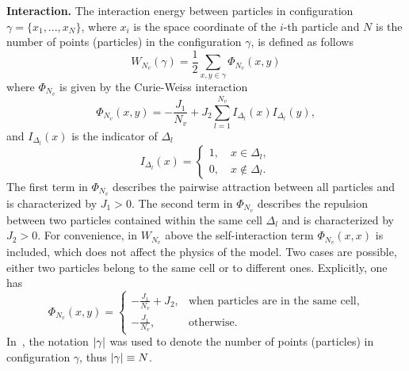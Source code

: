 \documentclass[12pt]{article}
\numberwithin{equation}{section}
\begin{document}
	\textbf{Interaction.} The interaction energy between particles in configuration $\gamma = \{x_1, ..., x_N\}$, where $x_i$ is the space coordinate of the $i$-th particle and $N$ is the number of points (particles) in the configuration $\gamma$, is defined as follows
	\begin{equation*}
		W_{N_v}(\gamma) = \frac{1}{2} \sum_{x,y \in \gamma} \Phi_{N_v} (x,y)
	\end{equation*}
	where $\Phi_{N_v}$ is given by the Curie-Weiss interaction
	\begin{equation}
		\label{def:curie-weiss-pot}
		\Phi_{N_v}(x, y) = -\frac{J_1}{N_v} + J_2\sum_{l=1}^{N_v} I_{\Delta_l}(x) I_{\Delta_l}(y),
	\end{equation}
	and $I_{\Delta_l}(x)$ is the indicator of $\Delta_l$
	\begin{equation}
		\label{def:I}
		I_{\Delta_l} (x) = \left\{
		\begin{array}{ll}
			1, \quad x \in \Delta_l,
			\\
			0, \quad x \notin \Delta_l.
		\end{array}
		\right.
	\end{equation}
	The first term in $\Phi_{N_v}$ describes the pairwise attraction between all particles and is characterized by $J_1 > 0$. The second term in $\Phi_{N_v}$ describes the repulsion between two particles contained within the same cell $\Delta_l$ and is characterized by $J_2 > 0.$ For convenience, in $W_{N_v}$ above the self-interaction term $\Phi_{N_v}(x,x)$ is included, which does not affect the physics of the model. Two cases are possible, either two particles belong to the same cell or to different ones. Explicitly, one has
	\begin{equation}
		\Phi_{N_v}(x, y) = \left\{
		\begin{array}{ll}
			-\frac{J_1}{N_v} + J_2, & \text{when particles are in the same cell,}
			\\
			-\frac{J_1}{N_v}, & \text{otherwise.}
		\end{array}
		\right.
	\end{equation}
	In~\cite{KKD20}, the notation $\abs{\gamma}$ was used to denote the number of points (particles) in configuration $\gamma$, thus $\abs{\gamma} \equiv N$.
	
\end{document}
